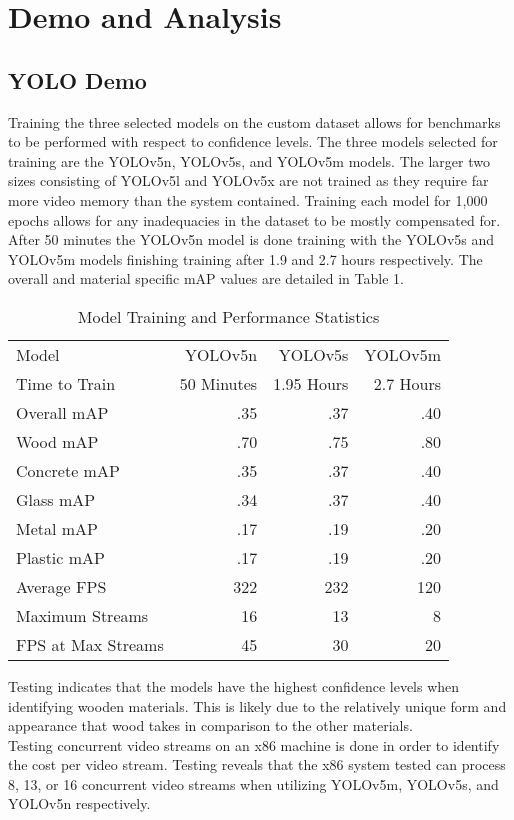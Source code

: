 \documentclass[conference]{IEEEtran}
\begin{document}
\section{Demo and Analysis}
\subsection{YOLO Demo}
Training the three selected models on the custom dataset allows for benchmarks to be performed with respect to confidence levels. The three models selected for training are the YOLOv5n, YOLOv5s, and YOLOv5m models. The larger two sizes consisting of YOLOv5l and YOLOv5x are not trained as they require far more video memory than the system contained. Training each model for 1,000 epochs allows for any inadequacies in the dataset to be mostly compensated for. After 50 minutes the YOLOv5n model is done training with the YOLOv5s and YOLOv5m models finishing training after 1.9 and 2.7 hours respectively. The overall and material specific mAP values are detailed in Table 1.\\
\begin{table}
        \centering
        \begin{tabular}{lrrr}
            Model & YOLOv5n & YOLOv5s & YOLOv5m\\
            Time to Train & 50 Minutes & 1.95 Hours & 2.7 Hours\\
            Overall mAP & .35 & .37 & .40\\
            Wood mAP & .70 & .75 & .80\\
            Concrete mAP & .35 & .37 & .40\\
            Glass mAP & .34 & .37 & .40\\
            Metal mAP & .17 & .19 & .20\\
            Plastic mAP & .17 & .19 & .20\\
            Average FPS & 322 & 232 & 120\\
            Maximum Streams & 16 & 13 & 8\\
            FPS at Max Streams & 45 & 30 & 20\\
        \end{tabular}
        \caption{Model Training and Performance Statistics}
        \label{tab:Performance}
    \end{table}
Testing indicates that the models have the highest confidence levels when identifying wooden materials. This is likely due to the relatively unique form and appearance that wood takes in comparison to the other materials.\\
Testing concurrent video streams on an x86 machine is done in order to identify the cost per video stream. Testing reveals that the x86 system tested can process 8, 13, or 16 concurrent video streams when utilizing YOLOv5m, YOLOv5s, and YOLOv5n respectively. 
\end{document}
